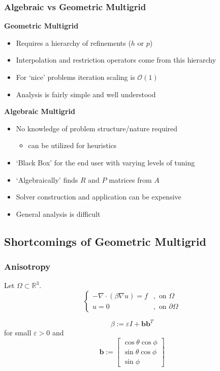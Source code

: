 \documentclass[xcolor=dvipsnames]{beamer}
\newcommand{\vc}{\boldsymbol}
\newcommand{\e}{\varepsilon}
\newcommand{\RR}{\mathbb{R}}
\begin{document}
\begin{frame}
  \frametitle{Algebraic vs Geometric Multigrid}

  \textbf{Geometric Multigrid}
  \begin{itemize}
    \item Requires a hierarchy of refinements ($h$ or $p$)
    \item Interpolation and restriction operators come from this hierarchy
    \item For `nice' problems iteration scaling is $\mathcal{O}(1)$
    \item Analysis is fairly simple and well understood
  \end{itemize}

  \vspace{0.3em}

  \textbf{Algebraic Multigrid}
  \begin{itemize}
    \item No knowledge of problem structure/nature required
      \begin{itemize}
        \item can be utilized for heuristics
      \end{itemize}
    \item `Black Box' for the end user with varying levels of tuning
    \item `Algebraically' finds $R$ and $P$ matrices from $A$
    \item Solver construction and application can be expensive
    \item General analysis is difficult
  \end{itemize}
\end{frame}

\subsection{Shortcomings of Geometric Multigrid}
\begin{frame}
  \frametitle{Anisotropy}
  
  Let $\Omega \subset \RR^3$.\\
  $$
  \begin{cases}
    -\nabla \cdot (\beta \nabla u) = f &,\text{ on } \Omega\\ 
    u=0 &,\text{ on } \partial \Omega
  \end{cases}
  $$

  $$\beta := \e I + \vc b \vc b^T$$
  for small $\e > 0$ and
  $$\vc b := \begin{bmatrix} \cos \theta \cos \phi\\ \sin \theta 
  \cos \phi \\ \sin \phi \end{bmatrix}$$

\end{frame}
\end{document}
